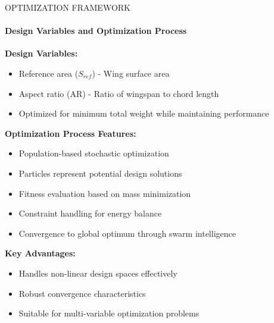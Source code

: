 \documentclass{beamer}
\begin{document}
\begin{frame}{OPTIMIZATION FRAMEWORK}
    \framesubtitle{Design Variables and Optimization Process}
    
    \textbf{Design Variables:}
    \begin{itemize}
        \item Reference area ($S_{ref}$) - Wing surface area
        \item Aspect ratio (AR) - Ratio of wingspan to chord length
        \item Optimized for minimum total weight while maintaining performance
    \end{itemize}
    
    \vspace{0.3cm}
    \textbf{Optimization Process Features:}
    \begin{itemize}
        \item Population-based stochastic optimization
        \item Particles represent potential design solutions
        \item Fitness evaluation based on mass minimization
        \item Constraint handling for energy balance
        \item Convergence to global optimum through swarm intelligence
    \end{itemize}
    
    \vspace{0.3cm}
    \textbf{Key Advantages:}
    \begin{itemize}
        \item Handles non-linear design spaces effectively
        \item Robust convergence characteristics
        \item Suitable for multi-variable optimization problems
    \end{itemize}
\end{frame}
\end{document}
